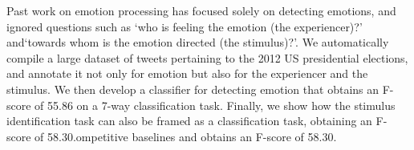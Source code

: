 Past work on emotion processing has focused solely on detecting emotions, and ignored questions such as `who is feeling the emotion (the experiencer)?' and`towards whom is the emotion directed (the stimulus)?'.  We automatically compile a large dataset of tweets pertaining to the 2012 US presidential elections, and annotate it not only for emotion but also for the experiencer and the stimulus. We then develop a classifier for detecting emotion that obtains an F-score of 55.86 on a 7-way classification task. Finally, we show how the stimulus identification task can also be framed as a classification task, obtaining an F-score of 58.30.ompetitive baselines and obtains an F-score of 58.30.
